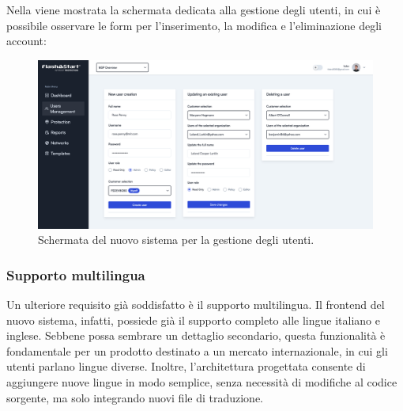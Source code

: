 Nella  viene mostrata la schermata dedicata alla gestione degli utenti, in cui è possibile osservare le form per l’inserimento, la modifica e l’eliminazione degli account:

\begin{figure}
  \centering
  \includegraphics[width=1\textwidth]{figures/new-user-panel.png}
  \caption{Schermata del nuovo sistema per la gestione degli utenti.}
  \label{fig:user-management}
\end{figure}

\subsubsection{Supporto multilingua}
Un ulteriore requisito già soddisfatto è il supporto multilingua. Il frontend del nuovo sistema, infatti, possiede già il supporto completo alle lingue italiano e inglese. Sebbene possa sembrare un dettaglio secondario, questa funzionalità è fondamentale per un prodotto destinato a un mercato internazionale, in cui gli utenti parlano lingue diverse. Inoltre, l’architettura progettata consente di aggiungere nuove lingue in modo semplice, senza necessità di modifiche al codice sorgente, ma solo integrando nuovi file di traduzione.

